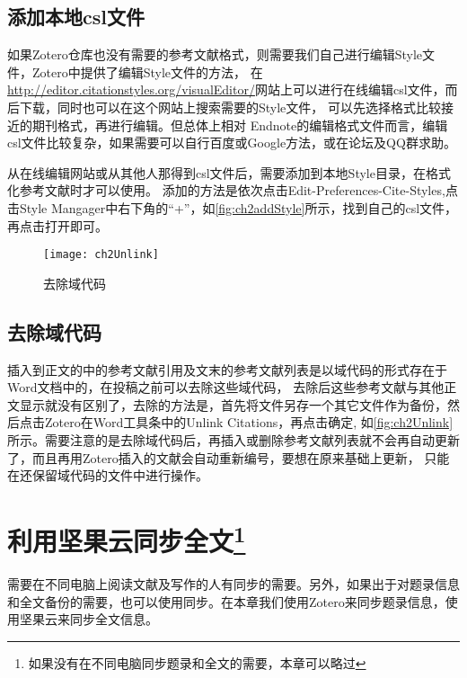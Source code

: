 \documentclass[cn,11pt,chinese]{elegantbook}
\begin{document}
		\section{添加本地csl文件}\label{sec:addStyle}
				如果Zotero仓库也没有需要的参考文献格式，则需要我们自己进行编辑Style文件，Zotero中提供了编辑Style文件的方法，
				在\url{http://editor.citationstyles.org/visualEditor/}网站上可以进行在线编辑csl文件，而后下载，同时也可以在这个网站上搜索需要的Style文件，
				可以先选择格式比较接近的期刊格式，再进行编辑。但总体上相对 Endnote的编辑格式文件而言，编辑csl文件比较复杂，如果需要可以自行百度或Google方法，或在论坛及QQ群求助。
			
				从在线编辑网站或从其他人那得到csl文件后，需要添加到本地Style目录，在格式化参考文献时才可以使用。
				添加的方法是依次点击Edit-Preferences-Cite-Styles,点击Style Mangager中右下角的“+”，如\autoref{fig:ch2addStyle}所示，找到自己的csl文件，再点击打开即可。
				\begin{figure}[htbp]
					\centering
					\texttt{[image: ch2Unlink]}
					\caption{去除域代码}
					\label{fig:ch2Unlink}
				\end{figure}
		
		\section{去除域代码}
			插入到正文的中的参考文献引用及文末的参考文献列表是以域代码的形式存在于Word文档中的，在投稿之前可以去除这些域代码，
			去除后这些参考文献与其他正文显示就没有区别了，去除的方法是，首先将文件另存一个其它文件作为备份，然后点击Zotero在Word工具条中的Unlink Citations，再点击确定,
			如\autoref{fig:ch2Unlink}所示。需要注意的是去除域代码后，再插入或删除参考文献列表就不会再自动更新了，而且再用Zotero插入的文献会自动重新编号，要想在原来基础上更新，
			只能在还保留域代码的文件中进行操作。
			
	\chapter[利用坚果云同步全文]{利用坚果云同步全文\footnote{如果没有在不同电脑同步题录和全文的需要，本章可以略过}}\label{ch:syn}		
		需要在不同电脑上阅读文献及写作的人有同步的需要。另外，如果出于对题录信息和全文备份的需要，也可以使用同步。在本章我们使用Zotero来同步题录信息，使用坚果云来同步全文信息。
\end{document}
